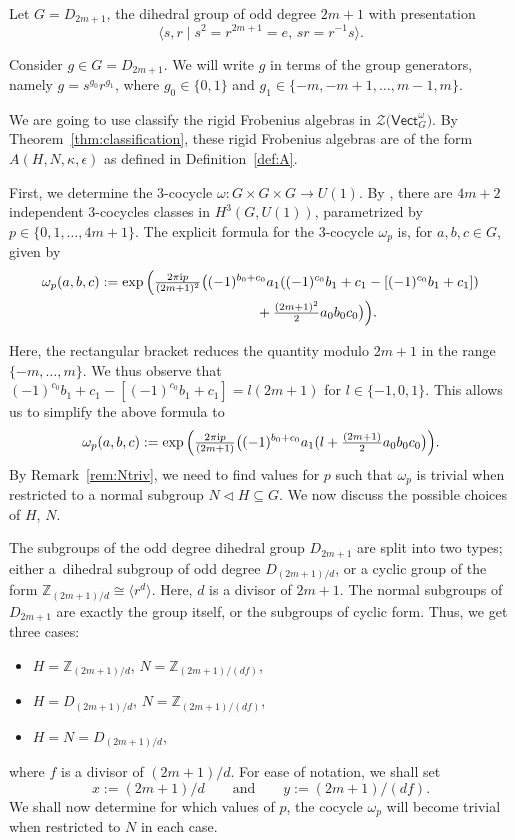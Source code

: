 \documentclass[10pt,a4paper]{amsart}
\numberwithin{equation}{section}
\newcommand{\Vect}{\mathsf{Vect}}
\newcommand{\mZ}{\mathbb{Z}}
\newcommand{\cZ}{\mathcal{Z}}
\begin{document}
Let $G = D_{2m+1}$, the dihedral group of odd degree $2m +1$ with presentation
\[\big\langle s,r \mid s^2 = r^{2m+1} = e ,\, sr = r^{-1}s \big\rangle.\]
\begin{Notation}
 Consider $g \in G=D_{2m+1}$. We will write $g$ in terms of the group generators, namely $g=s^{g_0}r^{g_1}$, where $g_0\in \lbrace 0,1 \rbrace$ and $g_1 \in \lbrace -m, -m+1, \dots , m-1, m \rbrace$.
\end{Notation}

We are going to use classify the rigid Frobenius algebras in $\cZ\big(\Vect_G^\omega\big)$.
By Theorem~\ref{thm:classification}, these rigid Frobenius algebras are of the form $A(H,N,\kappa,\epsilon)$ as defined in Definition~\ref{def:A}.

First, we determine the $3$-cocycle $\omega\colon G\times G \times G \to U(1)$.
By \cite[equation~3.2.8]{dWP}, there are $4m+2$ independent $3$-cocycles classes in $H^3(G,U(1))$, parametrized by $p \in \lbrace 0,1,\dots , 4m+1 \rbrace$. The explicit formula for the $3$-cocycle $\omega_p$ is, for $a,b,c \in G$, given by{\samepage
\begin{gather}
 \omega_p(a,b,c) :=\exp\Big(\tfrac{2\pi {\rm i} p}{(2m+1)^2}\big((-1)^{b_0+c_0}a_1((-1)^{c_0}b_1+c_1 - [(-1)^{c_0}b_1+c_1]) \nonumber\\
 \hphantom{\omega_p(a,b,c) :=\exp\Big(}{} + \tfrac{(2m+1)^2}{2}a_0b_0c_0\big) \Big).\label{eq:omega_p}
\end{gather}}

\noindent
Here, the rectangular bracket reduces the quantity modulo $2m+1$ in the range $\lbrace -m,\dots ,m \rbrace$.
We thus observe that $(-1)^{c_0}b_1+c_1 - [(-1)^{c_0}b_1+c_1] = l(2m+1)$ for $l\in \lbrace -1,0,1 \rbrace$. This allows us to simplify the above formula to
\begin{equation*}%
 \omega_p(a,b,c) :=\exp\Big(\tfrac{2\pi {\rm i} p}{(2m+1)}\big((-1)^{b_0+c_0}a_1(l + \tfrac{(2m+1)}{2}a_0b_0c_0\big) \Big).
\end{equation*}
By Remark~\ref{rem:Ntriv}, we need to find values for $p$ such that $\omega_p$ is trivial when restricted to a normal subgroup $N\triangleleft H \subseteq G$. We now discuss the possible choices of $H$, $N$.

The subgroups of the odd degree dihedral group $D_{2m+1}$ are split into two types; either a~dihedral subgroup of odd degree $D_{(2m+1)/d}$, or a cyclic group of the form $\mZ_{(2m+1)/d} \cong \langle r^{d}\rangle$. Here, $d$ is a divisor of $2m+1$.
The normal subgroups of $D_{2m+1}$ are exactly the group itself, or the subgroups of cyclic form. Thus, we get three cases:
\begin{itemize}\itemsep=0pt
 \item $H= \mZ_{(2m+1)/d}$, $N= \mZ_{(2m+1)/(df)}$,
 \item $H=D_{(2m+1)/d}$, $N = \mZ_{(2m+1)/(df)}$,
 \item $H=N=D_{(2m+1)/d}$,
\end{itemize}
where $f$ is a divisor of $(2m+1)/d$. For ease of notation, we shall set
\[x:=(2m+1)/d \qquad \text{and}\qquad y:=(2m+1)/(df).\]
We shall now determine for which values of $p$, the cocycle $\omega_p$ will become trivial when restricted to $N$ in each case.
\end{document}
